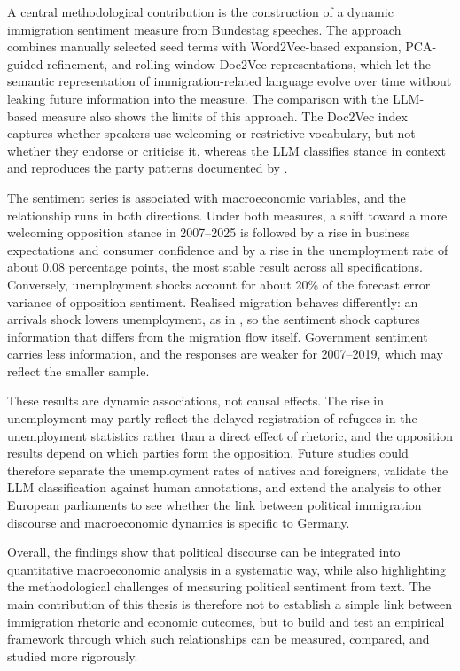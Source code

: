 \documentclass[12pt]{scrartcl}
\numberwithin{equation}{section}				%
\begin{document}
   A central methodological contribution is the construction of a dynamic immigration sentiment measure from Bundestag speeches. The approach combines manually selected seed terms with Word2Vec-based expansion, PCA-guided refinement, and rolling-window Doc2Vec representations, which let the semantic representation of immigration-related language evolve over time without leaking future information into the measure. The comparison with the LLM-based measure also shows the limits of this approach. The Doc2Vec index captures whether speakers use welcoming or restrictive vocabulary, but not whether they endorse or criticise it, whereas the LLM classifies stance in context and reproduces the party patterns documented by \textcite{kostikova2024fine}.
   
   The sentiment series is associated with macroeconomic variables, and the relationship runs in both directions. Under both measures, a shift toward a more welcoming opposition stance in 2007--2025 is followed by a rise in business expectations and consumer confidence and by a rise in the unemployment rate of about 0.08 percentage points, the most stable result across all specifications. Conversely, unemployment shocks account for about 20\% of the forecast error variance of opposition sentiment. Realised migration behaves differently: an arrivals shock lowers unemployment, as in \textcite{maffei2021does}, so the sentiment shock captures information that differs from the migration flow itself. Government sentiment carries less information, and the responses are weaker for 2007--2019, which may reflect the smaller sample.
   
   These results are dynamic associations, not causal effects. The rise in unemployment may partly reflect the delayed registration of refugees in the unemployment statistics rather than a direct effect of rhetoric, and the opposition results depend on which parties form the opposition. Future studies could therefore separate the unemployment rates of natives and foreigners, validate the LLM classification against human annotations, and extend the analysis to other European parliaments to see whether the link between political immigration discourse and macroeconomic dynamics is specific to Germany.
   
   Overall, the findings show that political discourse can be integrated into quantitative macroeconomic analysis in a systematic way, while also highlighting the methodological challenges of measuring political sentiment from text. The main contribution of this thesis is therefore not to establish a simple link between immigration rhetoric and economic outcomes, but to build and test an empirical framework through which such relationships can be measured, compared, and studied more rigorously.
   
\end{document}
